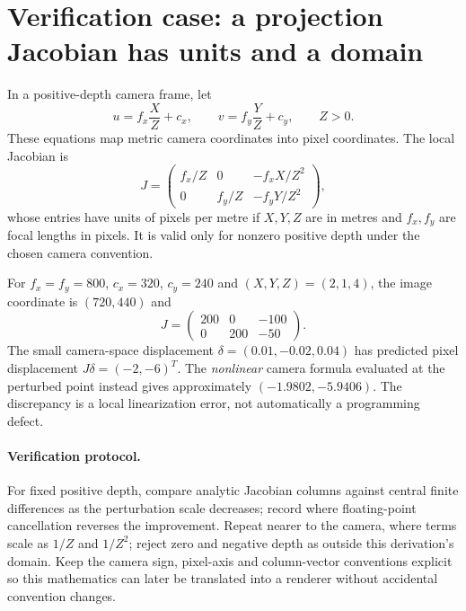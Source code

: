 \clearpage
\section*{Verification case: a projection Jacobian has units and a domain}
\noindent In a positive-depth camera frame, let
\[
u=f_x\frac XZ+c_x,\qquad
v=f_y\frac YZ+c_y,\qquad Z>0.
\]
These equations map metric camera coordinates into pixel coordinates.
The local Jacobian is
\[
J=\begin{pmatrix}
f_x/Z&0&-f_xX/Z^2\\
0&f_y/Z&-f_yY/Z^2
\end{pmatrix},
\]
whose entries have units of pixels per metre if \(X,Y,Z\) are in metres
and \(f_x,f_y\) are focal lengths in pixels.
It is valid only for nonzero positive depth under the chosen
camera convention.

For \(f_x=f_y=800\), \(c_x=320\), \(c_y=240\) and
\((X,Y,Z)=(2,1,4)\), the image coordinate is \((720,440)\)
and
\[
J=\begin{pmatrix}200&0&-100\\0&200&-50\end{pmatrix}.
\]
The small camera-space displacement
\(\delta=(0.01,-0.02,0.04)\) has predicted pixel displacement
\(J\delta=(-2,-6)^T\).
The \emph{nonlinear} camera formula evaluated at the perturbed point
instead gives approximately \((-1.9802,-5.9406)\).
The discrepancy is a local linearization error, not automatically
a programming defect.

\paragraph{Verification protocol.}
For fixed positive depth, compare analytic Jacobian columns against
central finite differences as the perturbation scale decreases;
record where floating-point cancellation reverses the improvement.
Repeat nearer to the camera, where terms scale as \(1/Z\) and
\(1/Z^2\); reject zero and negative depth as outside this
derivation's domain. Keep the camera sign, pixel-axis and
column-vector conventions explicit so this mathematics can later
be translated into a renderer without accidental convention changes.
